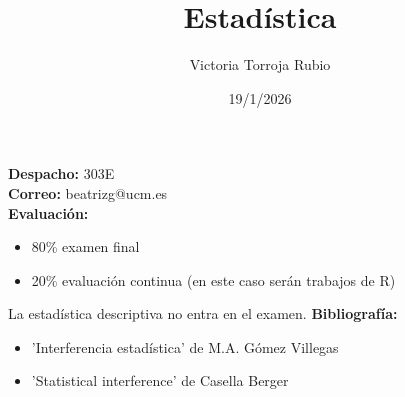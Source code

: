 \documentclass{report}
\begin{document}
\title{Estadística}
\author{Victoria Torroja Rubio}
\date{19/1/2026}

\maketitle

\tableofcontents

\pagebreak

\textbf{Despacho:} 303E \\
\textbf{Correo:} beatrizg@ucm.es \\
\textbf{Evaluación:} 
\begin{itemize}
\item 80\% examen final
\item 20\% evaluación continua (en este caso serán trabajos de R) 
\end{itemize}
La estadística descriptiva no entra en el examen.
\textbf{Bibliografía:} 
\begin{itemize}
\item 'Interferencia estadística' de M.A. Gómez Villegas 
\item 'Statistical interference' de Casella Berger
\end{itemize}





\appendix

\end{document}
